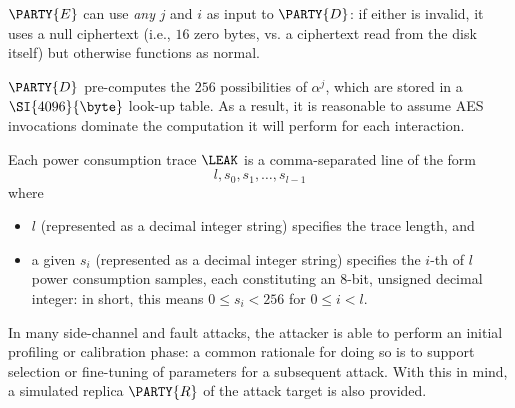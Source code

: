 \documentclass[crop={false},multi={true},tikz={true}]{standalone}
\begin{document}
\begin{itemize}
{      \noindent
      $\PARTY{E}$ can use {\em any} $j$ and $i$ as input to $\PARTY{D}$: if 
      either is invalid, it uses a null ciphertext (i.e., $16$ zero bytes, 
      vs. a ciphertext read from the disk itself) but otherwise functions 
      as normal.
\item $\PARTY{D}$ pre-computes the $256$ possibilities of $\alpha^j$, which 
      are stored in a $\SI{4096}{\byte}$ look-up table.  As a result, it is 
      reasonable to assume AES invocations dominate the computation it will
      perform for each interaction.
}{}%
\item Each power consumption trace $\LEAK$ is a comma-separated line of the 
      form
      \[
      l, s_0, s_1, \ldots, s_{l-1}
      \]
      where
         
      \begin{itemize}
      \item $l$
            (represented as a      decimal integer string)
            specifies the trace length, 
            and
      \item a given $s_i$
            (represented as a      decimal integer string)
            specifies the $i$-th of $l$ power consumption samples, each 
            constituting an $8$-bit, unsigned decimal integer: in short, 
            this means $0 \leq s_i < 256$ for $0 \leq i < l$.
      \end{itemize}
\end{itemize}


In many side-channel and fault attacks, the attacker is able to perform an 
initial profiling or calibration phase: a common rationale for doing so is 
to support selection or fine-tuning of parameters for a subsequent attack.  
With this in mind, a simulated replica $\PARTY{R}$ of the attack target is 
also provided.
%
\end{document}
